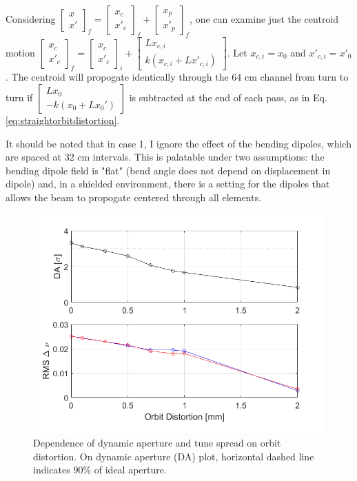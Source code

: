 Considering $\begin{bmatrix} x \\ x' \end{bmatrix}_f = \begin{bmatrix} x_c \\ x'_c \end{bmatrix}_f + \begin{bmatrix} x_p \\ x'_p \end{bmatrix}_f$, one can examine just the centroid motion $\begin{bmatrix} x_c \\ x'_c \end{bmatrix}_f = \begin{bmatrix} x_c \\ x'_c \end{bmatrix}_i + \begin{bmatrix} L x_{c,i} \\ k(x_{c,i} + Lx'_{c,i}) \end{bmatrix}$. Let $x_{c,i} = x_0$ and $x'_{c,i} = x'_0$. The centroid will propogate identically through the 64 cm channel from turn to turn if $\begin{bmatrix} L x_0 \\ -k(x_0 + Lx_0') \end{bmatrix}$ is subtracted at the end of each pass, as in Eq. \ref{eq:straightorbitdistortion}.

It should be noted that in case 1, I ignore the effect of the bending dipoles, which are spaced at 32 cm intervals. This is palatable under two assumptions: the bending dipole field is "flat" (bend angle does not depend on displacement in dipole) and, in a shielded environment, there is a setting for the dipoles that allows the beam to propogate centered through all elements. 

\begin{figure}
\centering
\includegraphics[width=0.8 \textwidth]{5.figures/steeringtolerance/DA_deltanu_plots_vs_orbit_distortion.png}
\caption{Dependence of dynamic aperture and tune spread on orbit distortion. On dynamic aperture (DA) plot, horizontal dashed line indicates $90\%$ of ideal aperture.}
\label{fig:DAvsorbitdistort}
\end{figure}

